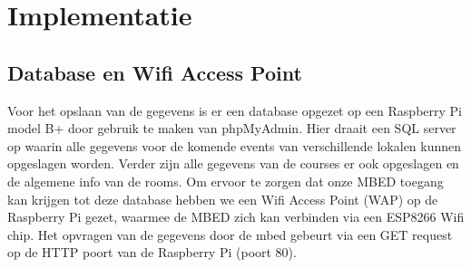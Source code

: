\documentclass[a4paper,kul]{kulakarticle} %
\begin{document}
\newpage

\section{Implementatie}
\subsection{Database en Wifi Access Point}
Voor het opslaan van de gegevens is er een database opgezet op een Raspberry Pi model B+ door gebruik te maken van phpMyAdmin. Hier draait een SQL server op waarin alle gegevens voor de komende events van verschillende lokalen kunnen opgeslagen worden. Verder zijn alle gegevens van de courses er ook opgeslagen en de algemene info van de rooms. Om ervoor te zorgen dat onze MBED toegang kan krijgen tot deze database hebben we een Wifi Access Point (WAP) op de Raspberry Pi gezet, waarmee de MBED zich kan verbinden via een ESP8266 Wifi chip. Het opvragen van de gegevens door de mbed gebeurt via een GET request op de HTTP poort van de Raspberry Pi (poort 80).
 
\end{document}
